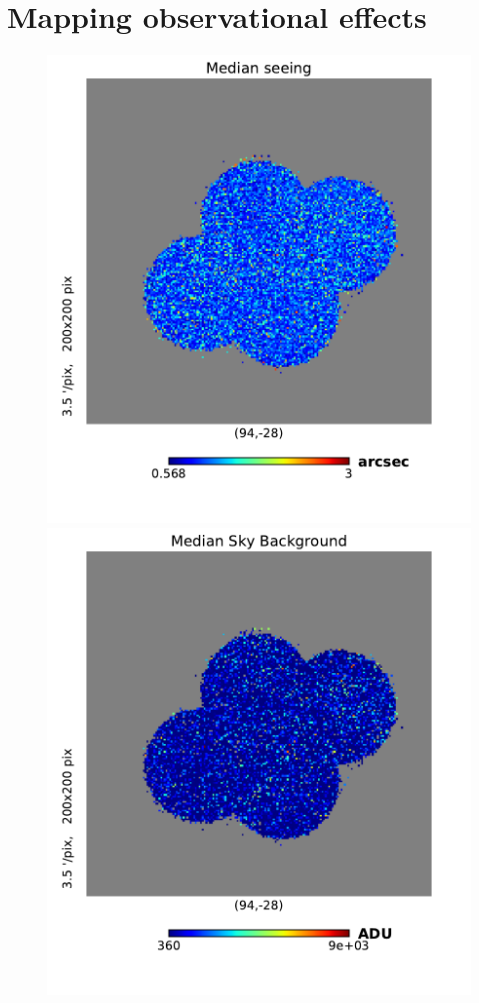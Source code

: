 \documentclass[\docopts]{\docclass}
\begin{document}
\section{Mapping observational effects}
\label{sec:systematic_maps}
\begin{figure}
\centering
\includegraphics[width=0.9\columnwidth]{median_seeing_2048.pdf}
\includegraphics[width=0.9\columnwidth]{median_skybg_2048.pdf}

\end{figure}
\end{document}
